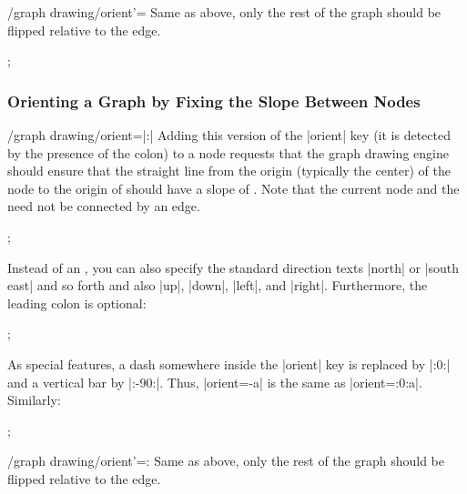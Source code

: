 \begin{key}{/graph drawing/orient'=}
  Same as above, only the rest of the graph should be flipped relative
  to the edge.
    
\begin{codeexample}[]
\tikz {};
\end{codeexample}
\end{key}


\subsubsection{Orienting a Graph by Fixing the Slope Between Nodes}

\begin{key}{/graph drawing/orient=\opt{|:|}|:|}
  Adding this version of the |orient| key (it is detected by the
  presence of the colon) to a node requests that the graph drawing
  engine should ensure that the straight line from the origin (typically
  the center) of the node to the origin of 
  should have a slope of . Note that the current node
  and the  need not be connected by an edge.
\begin{codeexample}[]
\tikz {};
\end{codeexample}
  
  Instead of an , you can also specify the standard
  direction texts |north| or |south east| and so forth and also
  |up|, |down|, |left|, and |right|. Furthermore, the leading colon is
  optional: 
\begin{codeexample}[]
\tikz {};
\end{codeexample}

  As special features, a dash somewhere inside the |orient| key is
  replaced by |:0:| and a vertical bar by |:-90:|. Thus, |orient=-a|
  is the same as |orient=:0:a|. Similarly:
\begin{codeexample}[]
\tikz {};
\end{codeexample}
\end{key}

\begin{key}{/graph drawing/orient'=:}
  Same as above, only the rest of the graph should be flipped relative
  to the edge.
\end{key}

